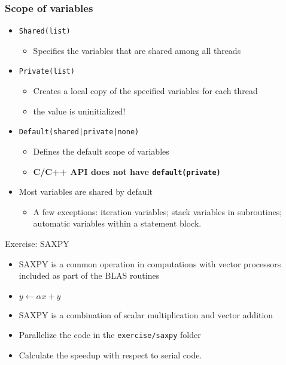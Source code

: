 \documentclass[10pt,t]{beamer}
\begin{document}
\begin{frame}
  \frametitle{Scope of variables}
  \begin{itemize}
    \item \texttt{Shared(list)}
    \begin{itemize}
      \item Specifies the variables that are shared among all threads
    \end{itemize}
    \item \texttt{Private(list)}
    \begin{itemize}
      \item Creates a local copy of the specified variables for each thread
      \item the value is uninitialized!
    \end{itemize}
    \item \texttt{Default(shared|private|none)}
    \begin{itemize}
      \item Defines the default scope of variables
      \item \textbf{C/C++ API does not have \texttt{default(private)}}
    \end{itemize}
    \item Most variables are shared by default
    \begin{itemize}
      \item A few exceptions: iteration variables; stack variables in subroutines; automatic variables within a statement block.
    \end{itemize}
  \end{itemize}
\end{frame}

\begin{frame}{Exercise: SAXPY}
  \begin{itemize}
    \item SAXPY is a common operation in computations with vector processors included as part of the BLAS routines
    \item[] $y\leftarrow \alpha x + y$
    \item SAXPY is a combination of scalar multiplication and vector addition
    \item Parallelize the code in the \texttt{exercise/saxpy} folder
    \item Calculate the speedup with respect to serial code.
  \end{itemize}
%      
%      
\end{frame}
\end{document}
